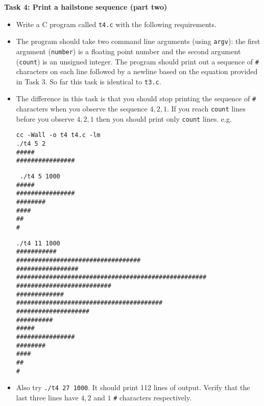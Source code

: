 \documentclass[11pt]{article}
\begin{document}
\begin{exe}
\begin{itemize}
\normalsize

\end{itemize}

\ex \textbf{Task 4: Print a hailstone sequence (part two)}

\begin{itemize}\addtolength{\itemsep}{-0.3\baselineskip}

\item Write a C program called \texttt{t4.c} with the following
requirements.

\item The program should take two command line arguments (using
\texttt{argv}): the first argument (\texttt{number}) is a floating
point number and the second argument (\texttt{count}) is an unsigned
integer. The program should print out a sequence of \texttt{\#} characters
on each line followed by a newline based on the equation provided
in Task 3. So far this task is identical to \texttt{t3.c}.

\item The difference in this task is that you should stop printing
the sequence of \texttt{\#} characters when you observe the sequence
$4, 2, 1$. If you reach \texttt{count} lines before you observe
$4, 2, 1$ then you should print only \texttt{count} lines. e.g. 

\footnotesize
\smallskip
\begin{minipage}{1.6in}
\begin{verbatim}
cc -Wall -o t4 t4.c -lm
./t4 5 2
#####
################
\end{verbatim}
\end{minipage}
\begin{minipage}{1.3in}
\begin{verbatim}
 ./t4 5 1000
#####
################
########
####
##
#
\end{verbatim}
\end{minipage}
\begin{minipage}{2in}
\begin{verbatim}
./t4 11 1000
###########
##################################
#################
####################################################
##########################
#############
########################################
####################
##########
#####
################
########
####
##
#
\end{verbatim}
\end{minipage}
\bigskip
\normalsize

\item Also try \texttt{./t4 27 1000}. It should print 112 lines of
output. Verify that the last three lines have $4, 2$ and $1$ \texttt{\#}
characters respectively.

\end{itemize}


\end{exe}
\end{document}

